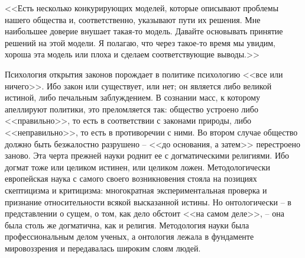 \documentclass{book}
\begin{document}
<<Есть несколько конкурирующих моделей, которые описы­вают проблемы нашего общества и, соответственно, указывают пути их решения. Мне наибольшее доверие внушает такая‑то модель. Давайте основывать принятие решений на этой модели. Я полагаю, что через такое‑то время мы увидим, хороша эта модель или плоха и сделаем соответствующие выводы.>>

Психология открытия законов порождает в политике психологию <<все или ничего>>. Ибо закон или существует, или нет; он является либо великой истиной, либо печальным заблуждением. В сознании масс, к которому апеллируют политики, это преломляется так: общество устроено либо <<правильно>>, то есть в соответствии с законами природы, либо <<неправильно>>, то есть в противоречии с ними. Во втором случае общество должно быть безжалостно разрушено -- <<до основания, а затем>> перестроено заново. Эта черта прежней науки роднит ее с догматическими религиями. Ибо догмат тоже или целиком истинен, или целиком ложен. Методологически европейская наука с самого своего возникновения стояла на позициях скептицизма и критицизма: многократная экспериментальная проверка и признание относительности всякой высказанной истины. Но онтологически -- в представлении о сущем, о том, как дело обстоит <<на самом деле>>, -- она была столь же догматична, как и религия. Методология науки была профессиональным делом ученых, а онтология лежала в фундаменте мировоззрения и пе­редавалась широким слоям людей.
\end{document}
